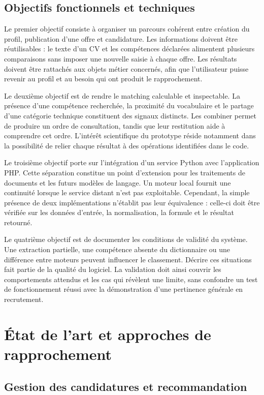 \subsection{Objectifs fonctionnels et techniques}

Le premier objectif consiste à organiser un parcours cohérent entre création du profil, publication d'une offre et candidature. Les informations doivent être réutilisables : le texte d'un CV et les compétences déclarées alimentent plusieurs comparaisons sans imposer une nouvelle saisie à chaque offre. Les résultats doivent être rattachés aux objets métier concernés, afin que l'utilisateur puisse revenir au profil et au besoin qui ont produit le rapprochement.

Le deuxième objectif est de rendre le matching calculable et inspectable. La présence d'une compétence recherchée, la proximité du vocabulaire et le partage d'une catégorie technique constituent des signaux distincts. Les combiner permet de produire un ordre de consultation, tandis que leur restitution aide à comprendre cet ordre. L'intérêt scientifique du prototype réside notamment dans la possibilité de relier chaque résultat à des opérations identifiées dans le code.

Le troisième objectif porte sur l'intégration d'un service Python avec l'application PHP. Cette séparation constitue un point d'extension pour les traitements de documents et les futurs modèles de langage. Un moteur local fournit une continuité lorsque le service distant n'est pas exploitable. Cependant, la simple présence de deux implémentations n'établit pas leur équivalence : celle-ci doit être vérifiée sur les données d'entrée, la normalisation, la formule et le résultat retourné.

Le quatrième objectif est de documenter les conditions de validité du système. Une extraction partielle, une compétence absente du dictionnaire ou une différence entre moteurs peuvent influencer le classement. Décrire ces situations fait partie de la qualité du logiciel. La validation doit ainsi couvrir les comportements attendus et les cas qui révèlent une limite, sans confondre un test de fonctionnement réussi avec la démonstration d'une pertinence générale en recrutement.

\section{État de l'art et approches de rapprochement}

\subsection{Gestion des candidatures et recommandation}


